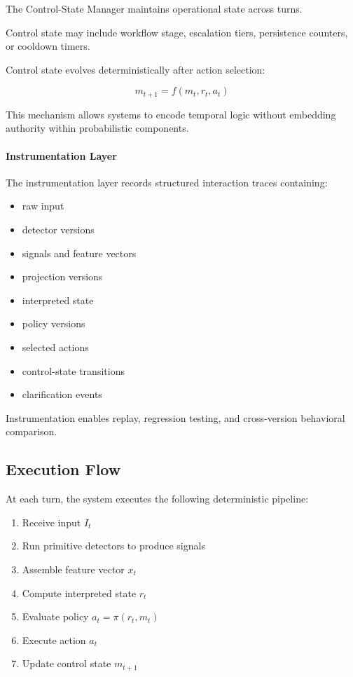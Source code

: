 \documentclass[11pt]{article}
\begin{document}
The Control-State Manager maintains operational state across turns.

Control state may include workflow stage, escalation tiers, persistence counters, or cooldown timers.

Control state evolves deterministically after action selection:

\[
m_{t+1} = f(m_t, r_t, a_t)
\]

This mechanism allows systems to encode temporal logic without embedding authority within probabilistic components.

\paragraph{Instrumentation Layer}

The instrumentation layer records structured interaction traces containing:

\begin{itemize}
  \item raw input
  \item detector versions
  \item signals and feature vectors
  \item projection versions
  \item interpreted state
  \item policy versions
  \item selected actions
  \item control-state transitions
  \item clarification events
\end{itemize}

Instrumentation enables replay, regression testing, and cross-version behavioral comparison.

\subsection{Execution Flow}

At each turn, the system executes the following deterministic pipeline:

\begin{enumerate}
\item Receive input $I_t$
\item Run primitive detectors to produce signals
\item Assemble feature vector $x_t$
\item Compute interpreted state $r_t$
\item Evaluate policy $a_t = \pi(r_t, m_t)$
\item Execute action $a_t$
\item Update control state $m_{t+1}$
\end{enumerate}
\end{document}
